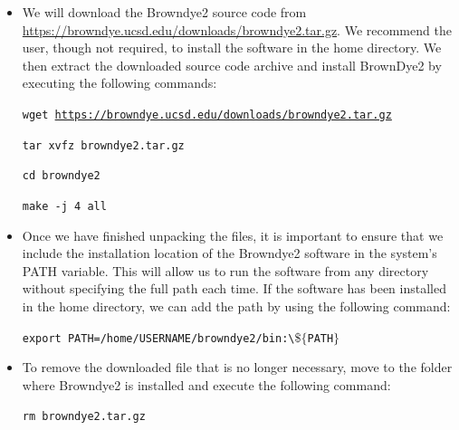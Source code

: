 \documentclass[9pt,training,pubversion]{livecoms}
\newcommand{\browndyelink}{\url{https://browndye.ucsd.edu/downloads/browndye2.tar.gz}}
\begin{document}
\begin{itemize}
\item We will download the Browndye2 source code from \browndyelink. We recommend the user, though not required, to install the software in the home directory. We then extract the downloaded source code archive and install BrownDye2 by executing the following commands:

\begin{tcolorbox}[colback=black!8!white, colframe=black!50!black, fontlower=\tiny, left=2pt, right=2pt, top=2pt, bottom=2pt] 
\texttt{wget \browndyelink} 
\end{tcolorbox}

\begin{tcolorbox}[colback=black!8!white, colframe=black!50!black, fontlower=\tiny, left=2pt, right=2pt, top=2pt, bottom=2pt] 
\texttt{tar xvfz browndye2.tar.gz} 
\end{tcolorbox}

\begin{tcolorbox}[colback=black!8!white, colframe=black!50!black, fontlower=\tiny, left=2pt, right=2pt, top=2pt, bottom=2pt] 
\texttt{cd browndye2} 
\end{tcolorbox}

\begin{tcolorbox}[colback=black!8!white, colframe=black!50!black, fontlower=\tiny, left=2pt, right=2pt, top=2pt, bottom=2pt] 
\texttt{make -j 4 all} 
\end{tcolorbox}

\item Once we have finished unpacking the files, it is important to ensure that we include the installation location of the Browndye2 software in the system's PATH variable. This will allow us to run the software from any directory without specifying the full path each time. If the software has been installed in the home directory, we can add the path by using the following command:

\begin{tcolorbox}[colback=black!8!white, colframe=black!50!black, fontlower=\tiny, left=2pt, right=2pt, top=2pt, bottom=2pt] 
\texttt{export PATH=/home/USERNAME/browndye2/bin:\textbackslash \linebreak $\$$$\{$PATH$\}$} 
\end{tcolorbox} 

\item To remove the downloaded file that is no longer necessary, move to the folder where Browndye2 is installed and execute the following command:
\begin{tcolorbox}[colback=black!8!white, colframe=black!50!black, fontlower=\tiny, left=2pt, right=2pt, top=2pt, bottom=2pt] 
\texttt{rm browndye2.tar.gz } 
\end{tcolorbox}

\end{itemize}
\end{document}
